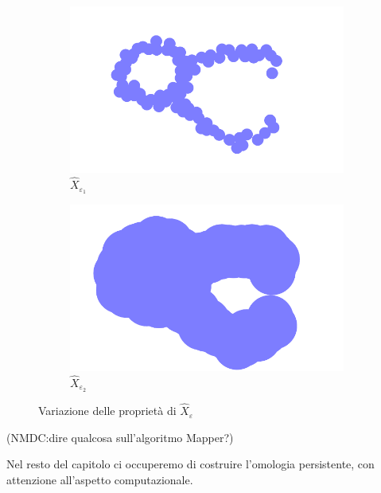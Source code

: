 \begin{figure}[ht]
  \begin{center}
    \begin{subfigure}[b]{.4\textwidth}
      \includegraphics[width=\textwidth]{gfx/double_circle_medium.pdf}
      \caption{$\widehat{X}_{\varepsilon_1}$}
    \end{subfigure}
    \begin{subfigure}[b]{.4\textwidth}
      \includegraphics[width=\textwidth]{gfx/double_circle_fat.pdf}
      \caption{$\widehat{X}_{\varepsilon_2}$}
    \end{subfigure}
    \caption{Variazione delle proprietà di $\widehat{X}_\varepsilon$}  \label{fig:doublecirclecomparison}
  \end{center}
\end{figure}

(NMDC:dire qualcosa sull'algoritmo Mapper?)

Nel resto del capitolo ci occuperemo di costruire l'omologia persistente, con attenzione all'aspetto computazionale.

